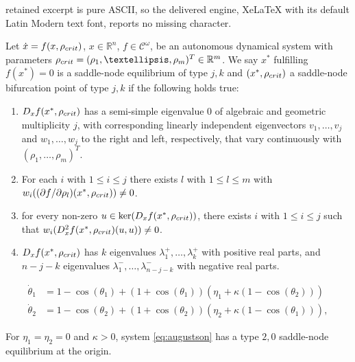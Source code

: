 \documentclass[10pt,a4paper]{amsart}
\begin{document}
retained excerpt is pure ASCII, so the delivered engine, XeLaTeX with its default Latin Modern text font, reports no missing character.
\begin{definition}\label{def:SN}
Let $\dot{x} = f(x,\rho_{\textnormal{crit}})$, $x\in \mathbb{R}^n$, $f\in \mathcal{C}^\omega$, be an autonomous dynamical system with parameters $\rho_{\textnormal{crit}} = (\rho_1,\dots,\rho_m)^T\in \mathbb{R}^m$. We say $x^*$ fulfilling $f(x^*)=0$ is a saddle-node equilibrium of type $j,k$ and $(x^*,\rho_{\textnormal{crit}})$ a saddle-node bifurcation point of type $j,k$ if the following holds true:
\begin{enumerate}[label={(\textbf{SN\arabic*})}, ref={(\textbf{G\arabic*})}]
    \item $D_xf(x^*,\rho_{\textnormal{crit}})$ has a semi-simple eigenvalue 0 of algebraic and geometric multiplicity $j$, with corresponding linearly independent eigenvectors  $v_1,\dots,v_j$ and $w_1,\dots,w_j$ to the right and left, respectively, that vary continuously with $(\rho_1,\dots,\rho_m)^T$.
    \item For each $i$ with $1\leq i \leq j$ there exists $l$ with $1\leq l \leq m$ with $w_i((\partial f/\partial\rho_l)(x^*,\rho_{\textnormal{crit}})) \neq 0$.
    \item for every non-zero $u\in \ker(D_xf(x^*,\rho_{\textnormal{crit}}))$, there exists $i$ with $1\leq i \leq j$ such that \mbox{$w_i(D_x^2f(x^*,\rho_{\textnormal{crit}})(u,u))\neq 0$}.
    \item $D_xf(x^*,\rho_{\textnormal{crit}})$ has $k$ eigenvalues $\lambda^+_1,\dots,\lambda^+_k$ with positive real parts, and $n-j-k$ eigenvalues $\lambda^-_1,\dots,\lambda^-_{n-j-k}$ with negative real parts.
\end{enumerate}
\end{definition}

\begin{align}
    \dot{\theta}_1 &= 1 - \cos(\theta_1) + \left(1 + \cos(\theta_1)\right) \left(\eta_1 + \kappa \left(1 - \cos(\theta_2)\right)\right) \label{eq:augustson}\\
    \dot{\theta}_2 &= 1 - \cos(\theta_2) + \left(1 + \cos(\theta_2)\right) \left(\eta_2 + \kappa \left(1 - \cos(\theta_1)\right)\right) \nonumber,
\end{align}

\begin{theorem} \label{theorem_jKSNinThetaNeurons}
For $\eta_1 = \eta_2  = 0$ and $\kappa >0$, system \ref{eq:augustson} has a type $2,0$ saddle-node equilibrium at the origin.
\end{theorem}
\end{document}
